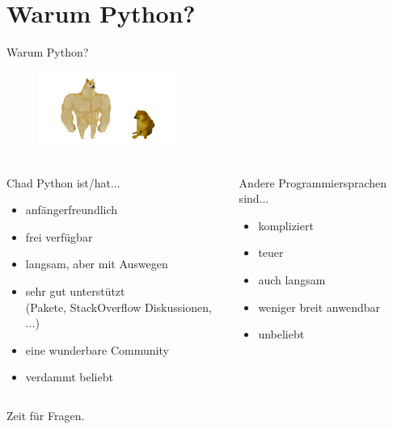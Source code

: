 \section{Warum Python?}
\begin{frame}{Warum Python?}
	\begin{figure}
		\includegraphics[width=0.4\textwidth]{../images/chad_python.jpg}
		
	\end{figure}
	\begin{columns}
	\begin{column}{0.7\textwidth}
		Chad Python ist/hat...
		\begin{itemize}
			\item anfängerfreundlich
			\item frei verfügbar
			\item langsam, aber mit Auswegen
			\item sehr gut unterstützt \\(Pakete, StackOverflow Diskussionen, $\dots$)
			\item eine wunderbare Community
			\item verdammt beliebt
		\end{itemize}
	\end{column}
	\begin{column}{0.4\textwidth}
		Andere Programmiersprachen sind...
		\begin{itemize}
			\item kompliziert
			\item teuer
			\item auch langsam
			\item weniger breit anwendbar
			\item unbeliebt
		\end{itemize}
	\end{column}
	\end{columns}
	
\end{frame}

\begin{frame}
	\huge Zeit für Fragen.
\end{frame}



